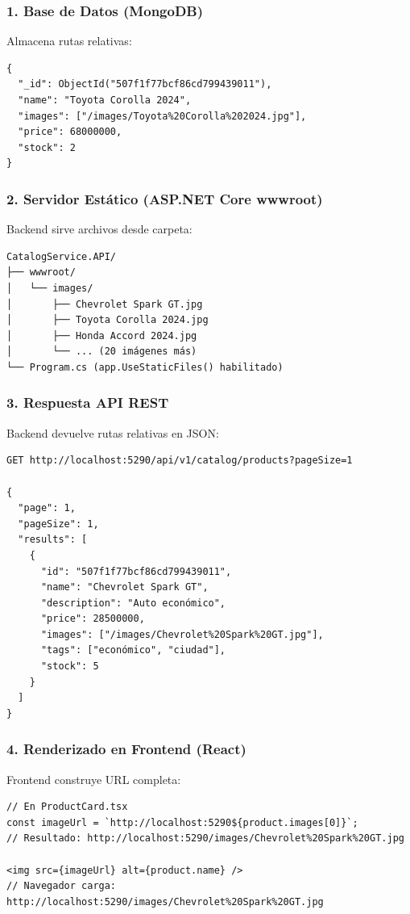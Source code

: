 \documentclass[12pt,a4paper]{article}
\begin{document}
\subsubsection{1. Base de Datos (MongoDB)}

Almacena rutas relativas:
\begin{lstlisting}
{
  "_id": ObjectId("507f1f77bcf86cd799439011"),
  "name": "Toyota Corolla 2024",
  "images": ["/images/Toyota%20Corolla%202024.jpg"],
  "price": 68000000,
  "stock": 2
}
\end{lstlisting}

\subsubsection{2. Servidor Estático (ASP.NET Core wwwroot)}

Backend sirve archivos desde carpeta:
\begin{lstlisting}
CatalogService.API/
├── wwwroot/
│   └── images/
│       ├── Chevrolet Spark GT.jpg
│       ├── Toyota Corolla 2024.jpg
│       ├── Honda Accord 2024.jpg
│       └── ... (20 imágenes más)
└── Program.cs (app.UseStaticFiles() habilitado)
\end{lstlisting}

\subsubsection{3. Respuesta API REST}

Backend devuelve rutas relativas en JSON:
\begin{lstlisting}
GET http://localhost:5290/api/v1/catalog/products?pageSize=1

{
  "page": 1,
  "pageSize": 1,
  "results": [
    {
      "id": "507f1f77bcf86cd799439011",
      "name": "Chevrolet Spark GT",
      "description": "Auto económico",
      "price": 28500000,
      "images": ["/images/Chevrolet%20Spark%20GT.jpg"],
      "tags": ["económico", "ciudad"],
      "stock": 5
    }
  ]
}
\end{lstlisting}

\subsubsection{4. Renderizado en Frontend (React)}

Frontend construye URL completa:
\begin{lstlisting}
// En ProductCard.tsx
const imageUrl = `http://localhost:5290${product.images[0]}`;
// Resultado: http://localhost:5290/images/Chevrolet%20Spark%20GT.jpg

<img src={imageUrl} alt={product.name} />
// Navegador carga: http://localhost:5290/images/Chevrolet%20Spark%20GT.jpg
\end{lstlisting}
\end{document}
